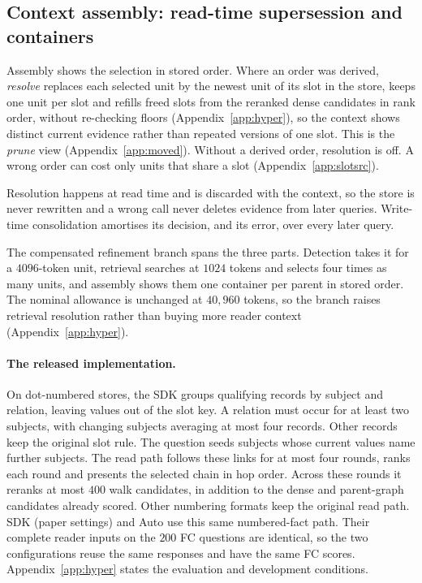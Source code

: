 \documentclass{article}
\begin{document}
\subsection{Context assembly: read-time supersession and containers}\label{sec:resolve}

Assembly shows the selection in stored order. Where an order was derived, \emph{resolve} replaces each selected unit by the newest unit of its slot in the store, keeps one unit per slot and refills freed slots from the reranked dense candidates in rank order, without re-checking floors (Appendix~\ref{app:hyper}), so the context shows distinct current evidence rather than repeated versions of one slot. This is the \emph{prune} view (Appendix~\ref{app:moved}). Without a derived order, resolution is off. A wrong order can cost only units that share a slot (Appendix~\ref{app:slotsrc}).

Resolution happens at read time and is discarded with the context, so the store is never rewritten and a
wrong call never deletes evidence from later queries. Write-time consolidation amortises its decision, and
its error, over every later query.

The compensated refinement branch spans the three parts. Detection takes it for a $4096$-token unit, retrieval searches at $1024$ tokens and selects four times as many units, and assembly shows them one container per parent in stored order. The nominal allowance is unchanged at $40{,}960$ tokens, so the branch raises retrieval resolution rather than buying more reader context (Appendix~\ref{app:hyper}).

\paragraph{The released implementation.} On dot-numbered stores, the SDK groups qualifying records by subject and relation, leaving values out of the slot key. A relation must occur for at least two subjects, with changing subjects averaging at most four records. Other records keep the original slot rule. The question seeds subjects whose current values name further subjects. The read path follows these links for at most four rounds, ranks each round and presents the selected chain in hop order. Across these rounds it reranks at most $400$ walk candidates, in addition to the dense and parent-graph candidates already scored. Other numbering formats keep the original read path. SDK (paper settings) and Auto use this same numbered-fact path. Their complete reader inputs on the $200$ FC questions are identical, so the two configurations reuse the same responses and have the same FC scores. Appendix~\ref{app:hyper} states the evaluation and development conditions.
\end{document}
